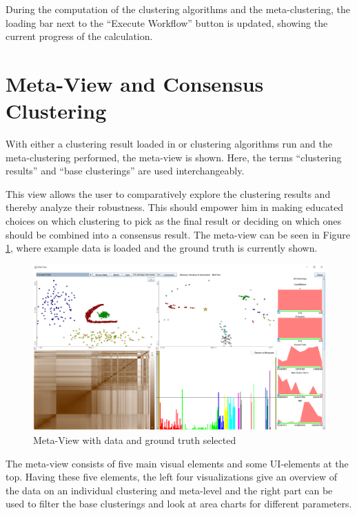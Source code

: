 \documentclass[
	a4paper,
	english,
	twoside,
	openright,               
	11pt                            
	]{report}
\begin{document}
During the computation of the clustering algorithms and the meta-clustering, the loading bar next to the ``Execute Workflow'' button is updated, showing the current progress of the calculation.

\section{Meta-View and Consensus Clustering}
With either a clustering result loaded in or clustering algorithms run and the meta-clustering performed, the meta-view is shown. Here, the terms ``clustering results'' and ``base clusterings'' are used interchangeably.

This view allows the user to comparatively explore the clustering results and thereby analyze their robustness. This should empower him in making educated choices on which clustering to pick as the final result or deciding on which ones should be combined into a consensus result. The meta-view can be seen in Figure \ref{fig:meta-view}, where example data is loaded and the ground truth is currently shown.

\begin{figure}[H]
	\centering
	\includegraphics[angle=-90,origin=c,scale=.42]{meta-view}
	\caption{Meta-View with data and ground truth selected}
	\label{fig:meta-view}
\end{figure}

The meta-view consists of five main visual elements and some UI-elements at the top. Having these five elements, the left four visualizations give an overview of the data on an individual clustering and meta-level and the right part can be used to filter the base clusterings and look at area charts for different parameters. 
\end{document}
